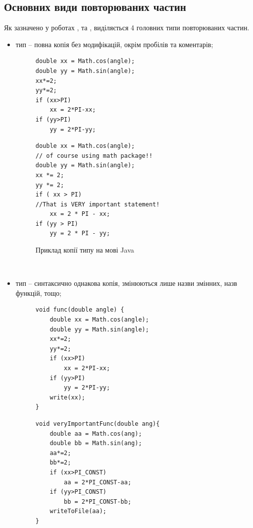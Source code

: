 \documentclass[a4paper, 14pt]{article}
\newcommand{\RNum}[1]{\uppercase\expandafter{\romannumeral #1\relax}}
\begin{document}
\subsection{Основних види повторюваних частин}
Як зазначено у роботах \cite{Gautam16}, \cite{Dang15} та \cite{Thummalapenta10}, виділяється 4 головних типи повторюваних частин. 
\begin{itemize}
\item \RNum{1} тип -- повна копія без модифікацій, окрім пробілів та коментарів;
\begin{figure}[!htb]
\centering
\begin{minipage}[t]{.45\textwidth}
\begin{lstlisting}[frame=none]
double xx = Math.cos(angle);
double yy = Math.sin(angle);
xx*=2;
yy*=2;	
if (xx>PI)
	xx = 2*PI-xx;
if (yy>PI)
	yy = 2*PI-yy;
\end{lstlisting}
\end{minipage}
\begin{minipage}[t]{.45\textwidth}
\begin{lstlisting}[frame=none]
double xx = Math.cos(angle);
// of course using math package!!
double yy = Math.sin(angle);
xx *= 2;
yy *= 2;	
if ( xx > PI)
//That is VERY important statement!
	xx = 2 * PI - xx; 
if (yy > PI)
	yy = 2 * PI - yy;
\end{lstlisting}
\end{minipage}
\caption{Приклад копії \RNum{1} типу на мові Java}
\end{figure} \\
\item \RNum{2} тип -- синтаксично однакова копія, змінюються лише назви змінних, назв функцій, тощо;
\begin{figure}[!htb]
\centering
\begin{minipage}[t]{.45\textwidth}
\begin{lstlisting}[frame=none]
void func(double angle) {
	double xx = Math.cos(angle);
	double yy = Math.sin(angle);
	xx*=2;
	yy*=2;	
	if (xx>PI)
		xx = 2*PI-xx;
	if (yy>PI)
		yy = 2*PI-yy;
	write(xx);
}
\end{lstlisting}
\end{minipage}
\begin{minipage}[t]{.45\textwidth}
\begin{lstlisting}[frame=none]
void veryImportantFunc(double ang){
	double aa = Math.cos(ang);
	double bb = Math.sin(ang);
	aa*=2;
	bb*=2;	
	if (xx>PI_CONST)
		aa = 2*PI_CONST-aa;
	if (yy>PI_CONST)
		bb = 2*PI_CONST-bb;
	writeToFile(aa);
}
\end{lstlisting}

\end{minipage}
\end{figure}
\end{itemize}
\end{document}
